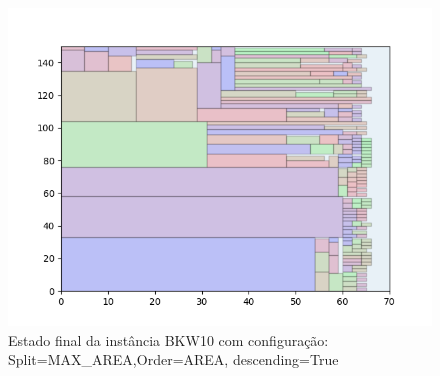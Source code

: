 \begin{figure}[H]
    \centering
    \caption[]{Estado final da instância BKW10 com configuração: Split=MAX_AREA,Order=AREA, descending=True}
    \label{fig:bkw10-max_area-area-true}
    \includegraphics[scale=0.5]{output/figures/bkw/bkw10/max_area/area/true/000}
\end{figure}